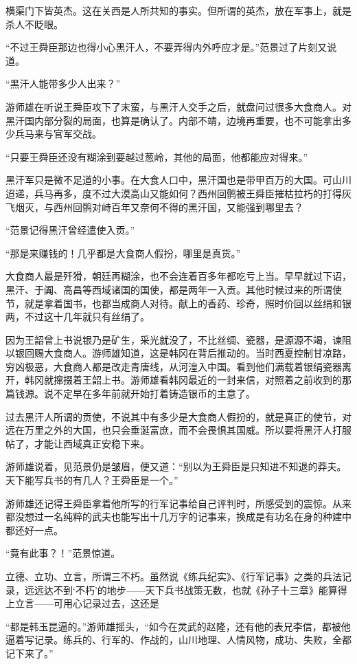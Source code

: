 横渠门下皆英杰。这在关西是人所共知的事实。但所谓的英杰，放在军事上，就是杀人不眨眼。

“不过王舜臣那边也得小心黑汗人，不要弄得内外呼应才是。”范景过了片刻又说道。

“黑汗人能带多少人出来？”

游师雄在听说王舜臣攻下了末蛮，与黑汗人交手之后，就盘问过很多大食商人。对黑汗国内部分裂的局面，也算是确认了。内部不靖，边境再重要，也不可能拿出多少兵马来与官军交战。

“只要王舜臣还没有糊涂到要越过葱岭，其他的局面，他都能应对得来。”

黑汗军只是微不足道的小事。在大食人口中，黑汗国也是带甲百万的大国。可山川迢递，兵马再多，度不过大漠高山又能如何？西州回鹘被王舜臣摧枯拉朽的打得灰飞烟灭，与西州回鹘对峙百年又奈何不得的黑汗国，又能强到哪里去？

“范景记得黑汗曾经遣使入贡。”

“那是来赚钱的！几乎都是大食商人假扮，哪里是真货。”

大食商人最是歼猾，朝廷再糊涂，也不会连着百多年都吃亏上当。早早就过下诏，黑汗、于阗、高昌等西域诸国的国使，都是两年一入贡。其他时候过来的所谓使节，就是拿着国书，也都当成商人对待。献上的香药、珍奇，照时价回以丝绢和银两，不过这十几年就只有丝绢了。

因为王韶曾上书说银乃是矿生，采光就没了，不比丝绸、瓷器，是源源不竭，谏阻以银回赐大食商人。游师雄知道，这是韩冈在背后推动的。当时西夏控制甘凉路，穷凶极恶，大食商人都是改走青唐线，从河湟入中国。看到他们满载着银绢瓷器离开，韩冈就撺掇着王韶上书。游师雄看韩冈最近的一封来信，对照着之前收到的那篇钱源。说不定早在多年前就开始打着铸造银币的主意了。

过去黑汗人所谓的贡使，不说其中有多少是大食商人假扮的，就是真正的使节，对远在万里之外的大国，也只会垂涎富庶，而不会畏惧其国威。所以要将黑汗人打服帖了，才能让西域真正安稳下来。

游师雄说着，见范景仍是皱眉，便又道：“别以为王舜臣是只知进不知退的莽夫。天下能写兵书的有几人？王舜臣是一个。”

游师雄还记得王舜臣拿着他所写的行军记事给自己评判时，所感受到的震惊。从来都没想过一名纯粹的武夫也能写出十几万字的记事来，换成是有功名在身的种建中都还好一点。

“竟有此事？！”范景惊道。

立德、立功、立言，所谓三不朽。虽然说《练兵纪实》、《行军记事》之类的兵法记录，远远达不到‘不朽’的地步——天下兵书战策无数，也就《孙子十三章》能算得上立言——可用心记录过去，这还是

“都是韩玉昆逼的。”游师雄摇头，“如今在灵武的赵隆，还有他的表兄李信，都被他逼着写记录。练兵的、行军的、作战的，山川地理、人情风物，成功、失败，全都记下来了。”

